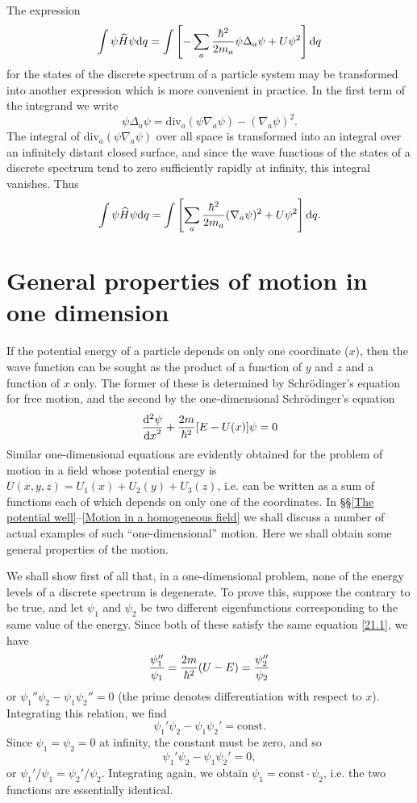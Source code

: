 The expression
\[ \int\psi\widehat{H}\psi\mathrm{d} q=\int\left[-\sum_{a}\frac{\hbar^2}{2m_a}\psi\Delta_a\psi+U\psi^2  \right]\mathrm{d} q \]
for the states of the discrete spectrum of a particle system may be transformed into another expression which is more convenient in practice. In the first term of the integrand we write
\[ \psi\Delta_a\psi=\mathrm{div}_a(\psi\nabla_a\psi)-(\nabla_a\psi)^2. \]
The integral of $\mathrm{div}_a(\psi\nabla_a\psi)  $ over all space is transformed into an integral over an infinitely distant closed surface, and since the wave functions of the states of a discrete spectrum tend to zero sufficiently rapidly at infinity, this integral vanishes. Thus
\begin{equation}\label{20.5}
\int\psi\widehat{H}\psi\mathrm{d} q=\int\left[\sum_{a}\frac{\hbar^2}{2m_a}(\nabla_a\psi)^2+U\psi^2  \right]\mathrm{d} q .
\end{equation}


\section{General properties of motion in one dimension}\label{General properties of motion in one dimension}
If the potential energy of a particle depends on only one coordinate ($ x $), then the wave function can be sought as the product of a function of $ y $ and $ z $ and a function of $ x $ only. The former of these is determined by Schr\"odinger's equation for free motion, and the second by the one-dimensional Schr\"odinger's equation
\begin{equation}\label{21.1}
\frac{\mathrm{d}^2\psi}{{\mathrm{d} x}^2}+\frac{2m}{\hbar^2}[E-U(x)]\psi=0
\end{equation}
Similar one-dimensional equations are evidently obtained for the problem of motion in a field whose potential energy is $ U (x, y, z) = U_1(x) + U_2(y) + U_3(z) $, i.e. can be written as a sum of functions each of which depends on only one of the coordinates. In \S\S\ref{The potential well}--\ref{Motion in a homogeneous field} we shall discuss a number of actual examples of such “one-dimensional” motion. Here we shall obtain some general properties of the motion.

We shall show first of all that, in a one-dimensional problem, none of the energy levels of a discrete spectrum is degenerate. To prove this, suppose the contrary to be true, and let $\psi_1$ and $\psi_2$ be two different eigenfunctions corresponding to the same value of the energy. Since both of these satisfy the same equation \eqref{21.1}, we have
\[ \frac{\psi_1''}{\psi_1}=\frac{2m}{\hbar^2}(U-E)=\frac{\psi_2''}{\psi_2} \]
or $ \psi_1''\psi_2-\psi_1\psi_2''=0 $ (the prime denotes differentiation with respect to $ x $). Integrating this relation, we find
\begin{equation}\label{21.2}
\psi_1'\psi_2-\psi_1\psi_2'=\mathrm{const}.
\end{equation}
Since $ \psi_1=\psi_2=0 $ at infinity, the constant must be zero, and so
\[\psi_1'\psi_2-\psi_1\psi_2'=0,  \]
or $ \psi_1'/\psi_1=\psi_2'/\psi_2 $. Integrating again, we obtain $ \psi_1=\mathrm{const}\cdot\psi_2 $, i.e. the two functions are essentially identical.

